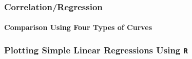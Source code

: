 \documentclass[10pt]{beamer}
\begin{document}
\begin{frame}
\frametitle{Correlation/Regression}
\framesubtitle{Comparison Using Four Types of Curves}
\label{regression2}
\begin{center}
\end{center}
\end{frame}



\begin{frame}
\frametitle{Plotting Simple Linear Regressions Using {\color{red} \tt R}}
\begin{center}
\end{center}
\end{frame}
\end{document}
